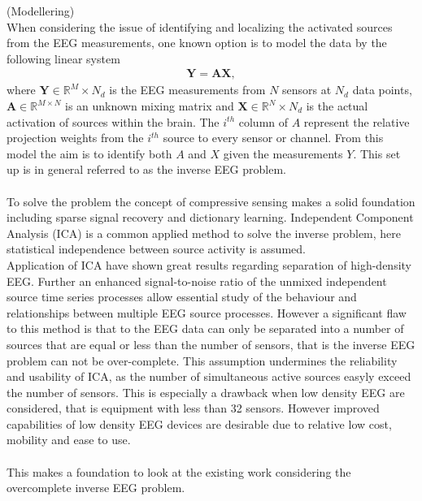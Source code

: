 (Modellering)\\
When considering the issue of identifying and localizing the activated sources from the EEG measurements, one known option is to model the data by the following linear system 
\begin{align*}
\mathbf{Y} = \mathbf{AX},
\end{align*}
where $\mathbf{Y} \in \mathbb{R}^M\times N_d$ is the EEG measurements from $N$ sensors at $N_d$ data points, $\mathbf{A} \in \mathbb{R}^{M \times N}$ is an unknown mixing matrix and $\mathbf{X} \in \mathbb{R}^N \times N_d$ is the actual activation of sources within the brain. The $i^{th}$ column of $A$ represent the relative projection weights from the $i^{th}$ source to every sensor or channel\cite{phd2015}. 
From this model the aim is to identify both $A$ and $X$ given the measurements $Y$. This set up is in general referred to as the inverse EEG problem.  \\
\\
To solve the problem the concept of compressive sensing makes a solid foundation including sparse signal recovery and dictionary learning. Independent Component Analysis (ICA) is a common applied method to solve the inverse problem\cite{Scott1996}\cite{Scott1997}, here statistical independence between source activity is assumed. \\
Application of ICA have shown great results regarding separation of high-density EEG. Further an enhanced signal-to-noise ratio of the unmixed independent source time series processes allow essential study of the behaviour and relationships between multiple EEG source processes\cite{Arnaud2012}. However a significant flaw to this method is that to the EEG data can only be separated into a number of sources that are equal or less than the number of sensors, that is the inverse EEG problem can not be over-complete. This assumption undermines the reliability and usability of ICA, as the number of simultaneous active sources easyly  exceed the number of sensors\cite{phd2015}. This is especially a drawback when low density EEG are considered, that is equipment with less than 32 sensors. However improved capabilities of low density EEG devices are desirable due to relative low cost, mobility and ease to use. \\  
\\
This makes a foundation to look at the existing work considering the overcomplete inverse EEG problem. 

